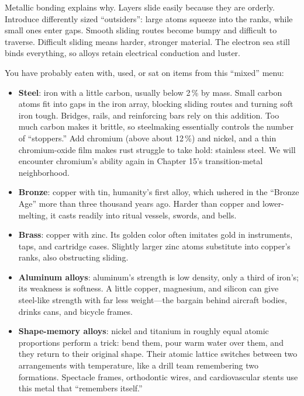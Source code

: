 Metallic bonding explains why. Layers slide easily because they are orderly. Introduce differently sized ``outsiders'': large atoms squeeze into the ranks, while small ones enter gaps. Smooth sliding routes become bumpy and difficult to traverse. Difficult sliding means harder, stronger material. The electron sea still binds everything, so alloys retain electrical conduction and luster.

You have probably eaten with, used, or sat on items from this ``mixed'' menu:

\begin{itemize}[itemsep=2pt]
\item \textbf{Steel}: iron with a little carbon, usually below 2\,\% by mass. Small carbon atoms fit into gaps in the iron array, blocking sliding routes and turning soft iron tough. Bridges, rails, and reinforcing bars rely on this addition. Too much carbon makes it brittle, so steelmaking essentially controls the number of ``stoppers.'' Add chromium (above about 12\,\%) and nickel, and a thin chromium-oxide film makes rust struggle to take hold: stainless steel. We will encounter chromium's ability again in Chapter 15's transition-metal neighborhood.
\item \textbf{Bronze}: copper with tin, humanity's first alloy, which ushered in the ``Bronze Age'' more than three thousand years ago. Harder than copper and lower-melting, it casts readily into ritual vessels, swords, and bells.
\item \textbf{Brass}: copper with zinc. Its golden color often imitates gold in instruments, taps, and cartridge cases. Slightly larger zinc atoms substitute into copper's ranks, also obstructing sliding.
\item \textbf{Aluminum alloys}: aluminum's strength is low density, only a third of iron's; its weakness is softness. A little copper, magnesium, and silicon can give steel-like strength with far less weight---the bargain behind aircraft bodies, drinks cans, and bicycle frames.
\item \textbf{Shape-memory alloys}: nickel and titanium in roughly equal atomic proportions perform a trick: bend them, pour warm water over them, and they return to their original shape. Their atomic lattice switches between two arrangements with temperature, like a drill team remembering two formations. Spectacle frames, orthodontic wires, and cardiovascular stents use this metal that ``remembers itself.''
\end{itemize}

